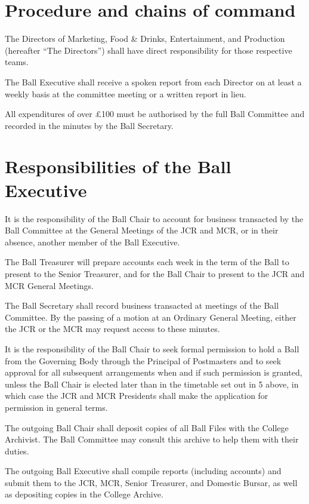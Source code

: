 \section{Procedure and chains of command}

\appnpara The Directors of Marketing, Food \& Drinks, Entertainment, and Production (hereafter “The Directors”) shall have direct responsibility for those respective teams. 

\appnpara The Ball Executive shall receive a spoken report from each Director on at least a weekly basis at the committee meeting or a written report in lieu.

\appnpara All expenditures of over £100 must be authorised by the full Ball Committee and recorded in the minutes by the Ball Secretary.

\section{Responsibilities of the Ball Executive}

\appnpara It is the responsibility of the Ball Chair to account for business transacted by the Ball Committee at the General Meetings of the JCR and MCR, or in their absence, another member of the Ball Executive.

\appnpara The Ball Treasurer will prepare accounts each week in the term of the Ball to present to the Senior Treasurer, and for the Ball Chair to present to the JCR and MCR General Meetings.

\appnpara The Ball Secretary shall record business transacted at meetings of the Ball Committee. By the passing of a motion at an Ordinary General Meeting, either the JCR or the MCR may request access to these minutes.

\appnpara It is the responsibility of the Ball Chair to seek formal permission to hold a Ball from the Governing Body through the Principal of Postmasters and to seek approval for all subsequent arrangements when and if such permission is granted, unless the Ball Chair is elected later than in the timetable set out in 5 above, in which case the JCR and MCR Presidents shall make the application for permission in general terms.

\appnpara The outgoing Ball Chair shall deposit copies of all Ball Files with the College Archivist.  The Ball Committee may consult this archive to help them with their duties.

\appnpara The outgoing Ball Executive shall compile reports (including accounts) and submit them to the JCR, MCR, Senior Treasurer, and Domestic Bursar, as well as depositing copies in the College Archive.  

